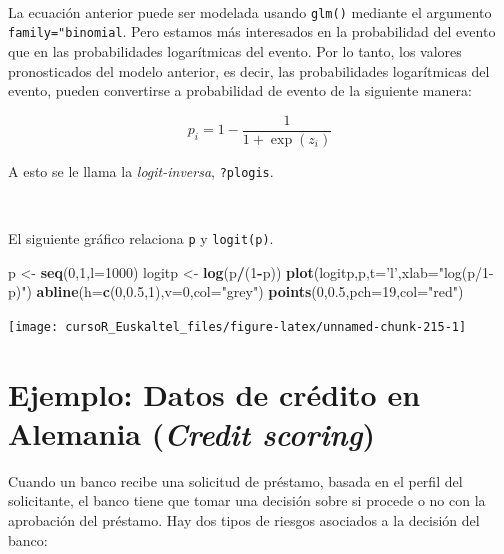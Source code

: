 \documentclass[]{book}
\newenvironment{Shaded}{\begin{snugshade}}{\end{snugshade}}
\newcommand{\KeywordTok}[1]{\textcolor[rgb]{0.13,0.29,0.53}{\textbf{#1}}}
\newcommand{\DataTypeTok}[1]{\textcolor[rgb]{0.13,0.29,0.53}{#1}}
\newcommand{\DecValTok}[1]{\textcolor[rgb]{0.00,0.00,0.81}{#1}}
\newcommand{\FloatTok}[1]{\textcolor[rgb]{0.00,0.00,0.81}{#1}}
\newcommand{\StringTok}[1]{\textcolor[rgb]{0.31,0.60,0.02}{#1}}
\newcommand{\OperatorTok}[1]{\textcolor[rgb]{0.81,0.36,0.00}{\textbf{#1}}}
\newcommand{\NormalTok}[1]{#1}
\begin{document}
~

La ecuación anterior puede ser modelada usando \texttt{glm()} mediante
el argumento \texttt{family="binomial}. Pero estamos más interesados en
la probabilidad del evento que en las probabilidades logarítmicas del
evento. Por lo tanto, los valores pronosticados del modelo anterior, es
decir, las probabilidades logarítmicas del evento, pueden convertirse a
probabilidad de evento de la siguiente manera:

\[
  p_i =1-\frac{1}{1 + \exp(z_i)}
\]

A esto se le llama la \emph{logit-inversa}, \texttt{?plogis}.

~

El siguiente gráfico relaciona \texttt{p} y \texttt{logit(p)}.

\begin{Shaded}
\begin{Highlighting}[]
\NormalTok{p <-}\StringTok{ }\KeywordTok{seq}\NormalTok{(}\DecValTok{0}\NormalTok{,}\DecValTok{1}\NormalTok{,}\DataTypeTok{l=}\DecValTok{1000}\NormalTok{)}
\NormalTok{logitp <-}\StringTok{ }\KeywordTok{log}\NormalTok{(p}\OperatorTok{/}\NormalTok{(}\DecValTok{1}\OperatorTok{-}\NormalTok{p))}
\KeywordTok{plot}\NormalTok{(logitp,p,}\DataTypeTok{t=}\StringTok{'l'}\NormalTok{,}\DataTypeTok{xlab=}\StringTok{"log(p/1-p)"}\NormalTok{)}
\KeywordTok{abline}\NormalTok{(}\DataTypeTok{h=}\KeywordTok{c}\NormalTok{(}\DecValTok{0}\NormalTok{,}\FloatTok{0.5}\NormalTok{,}\DecValTok{1}\NormalTok{),}\DataTypeTok{v=}\DecValTok{0}\NormalTok{,}\DataTypeTok{col=}\StringTok{"grey"}\NormalTok{)}
\KeywordTok{points}\NormalTok{(}\DecValTok{0}\NormalTok{,}\FloatTok{0.5}\NormalTok{,}\DataTypeTok{pch=}\DecValTok{19}\NormalTok{,}\DataTypeTok{col=}\StringTok{"red"}\NormalTok{)}
\end{Highlighting}
\end{Shaded}

\begin{center}\texttt{[image: cursoR\_Euskaltel\_files/figure-latex/unnamed-chunk-215-1]} \end{center}

\section{\texorpdfstring{Ejemplo: Datos de crédito en Alemania
(\emph{Credit
scoring})}{Ejemplo: Datos de crédito en Alemania (Credit scoring)}}\label{ejemplo-datos-de-credito-en-alemania-credit-scoring}

Cuando un banco recibe una solicitud de préstamo, basada en el perfil
del solicitante, el banco tiene que tomar una decisión sobre si procede
o no con la aprobación del préstamo. Hay dos tipos de riesgos asociados
a la decisión del banco:
\end{document}
